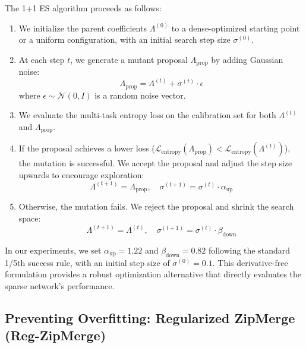 The 1+1 ES algorithm proceeds as follows:
\begin{enumerate}[leftmargin=*]
    \item We initialize the parent coefficients $\Lambda^{(0)}$ to a dense-optimized starting point or a uniform configuration, with an initial search step size $\sigma^{(0)}$.
    \item At each step $t$, we generate a mutant proposal $\Lambda_{\text{prop}}$ by adding Gaussian noise:
    \begin{equation}
        \Lambda_{\text{prop}} = \Lambda^{(t)} + \sigma^{(t)} \cdot \epsilon
    \end{equation}
    where $\epsilon \sim \mathcal{N}(0, I)$ is a random noise vector.
    \item We evaluate the multi-task entropy loss on the calibration set for both $\Lambda^{(t)}$ and $\Lambda_{\text{prop}}$.
    \item If the proposal achieves a lower loss ($\mathcal{L}_{\text{entropy}}(\Lambda_{\text{prop}}) < \mathcal{L}_{\text{entropy}}(\Lambda^{(t)})$), the mutation is successful. We accept the proposal and adjust the step size upwards to encourage exploration:
    \begin{equation}
        \Lambda^{(t+1)} = \Lambda_{\text{prop}}, \quad \sigma^{(t+1)} = \sigma^{(t)} \cdot \alpha_{\text{up}}
    \end{equation}
    \item Otherwise, the mutation fails. We reject the proposal and shrink the search space:
    \begin{equation}
        \Lambda^{(t+1)} = \Lambda^{(t)}, \quad \sigma^{(t+1)} = \sigma^{(t)} \cdot \beta_{\text{down}}
    \end{equation}
\end{enumerate}

In our experiments, we set $\alpha_{\text{up}} = 1.22$ and $\beta_{\text{down}} = 0.82$ following the standard 1/5th success rule, with an initial step size of $\sigma^{(0)} = 0.1$. This derivative-free formulation provides a robust optimization alternative that directly evaluates the sparse network's performance.

\subsection{Preventing Overfitting: Regularized ZipMerge (Reg-ZipMerge)}

